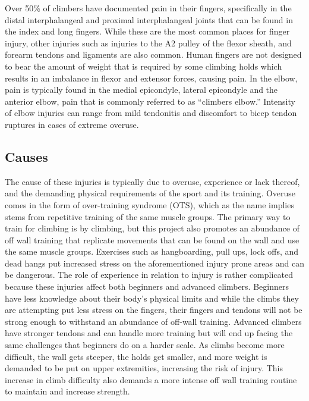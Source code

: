 \documentclass[10pt,twocolumn]{article}
\begin{document}
Over 50\% of climbers have documented pain in their fingers, specifically in the distal interphalangeal and proximal interphalangeal joints that can be found in the index and long fingers. \cite{meyers_rock_nodate} While these are the most common places for finger injury, other injuries such as injuries to the A2 pulley of the flexor sheath, and forearm tendons and ligaments are also common. Human fingers are not designed to bear the amount of weight that is required by some climbing holds which results in an imbalance in flexor and extensor forces, causing pain. In the elbow, pain is typically found in the medial epicondyle, lateral epicondyle and the anterior elbow, pain that is commonly referred to as “climbers elbow.” Intensity of elbow injuries can range from mild tendonitis and discomfort to bicep tendon ruptures in cases of extreme overuse. \cite{meyers_rock_nodate}
 

\subsection{Causes}
	The cause of these injuries is typically due to overuse, experience or lack thereof, and the demanding physical requirements of the sport and its training. Overuse comes in the form of over-training syndrome (OTS), which as the name implies stems from repetitive training of the same muscle groups. The primary way to train for climbing is by climbing, but this project also promotes an abundance of off wall training that replicate movements that can be found on the wall and use the same muscle groups. Exercises such as hangboarding, pull ups, lock offs, and dead hangs put increased stress on the aforementioned injury prone areas and can be dangerous. The role of experience in relation to injury is rather complicated because these injuries affect both beginners and advanced climbers. Beginners have less knowledge about their body’s physical limits and while the climbs they are attempting put less stress on the fingers, their fingers and tendons will not be strong enough to withstand an abundance of off-wall training. Advanced climbers have stronger tendons and can handle more training but will end up facing the same challenges that beginners do on a harder scale. As climbs become more difficult, the wall gets steeper, the holds get smaller, and more weight is demanded to be put on upper extremities, increasing the risk of injury. This increase in climb difficulty also demands a more intense off wall training routine to maintain and increase strength.  \cite{meyers_rock_nodate}
\end{document}
